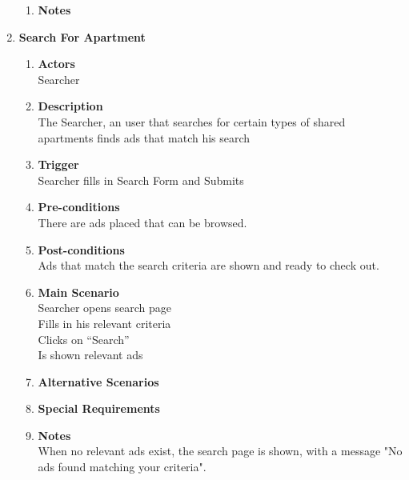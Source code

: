 \documentclass{scrreprt}
\begin{document}
\begin{enumerate}
\begin{enumerate}
		\item \textbf{Notes} \\
	\end{enumerate}


	\item \textbf{Search For Apartment}
	\begin{enumerate}
		\item \textbf{Actors}  \\
			Searcher\\

		\item \textbf{Description} \\
			The Searcher, an user that searches for certain types of shared apartments finds ads that match his search\\
			
		\item \textbf{Trigger} \\
			Searcher fills in Search Form and Submits\\

		\item \textbf{Pre-conditions} \\
			There are ads placed that can be browsed.\\

		\item \textbf{Post-conditions} \\
			Ads that match the search criteria are shown and ready to check out.\\

		\item \textbf{Main Scenario} \\
			Searcher opens search page\\
			Fills in his relevant criteria\\
			Clicks on “Search”\\
			Is shown relevant ads\\

		\item \textbf{Alternative Scenarios} \\

		\item \textbf{Special Requirements} \\

		\item \textbf{Notes} \\
			When no relevant ads exist, the search page is shown, with a message "No ads found matching your criteria".\\
	\end{enumerate}



\end{enumerate}
\end{document}
